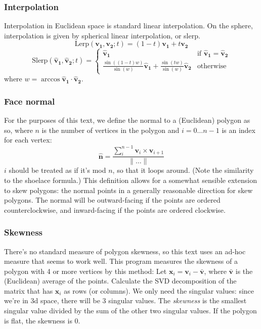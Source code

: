 \documentclass{amsart}[12pt]
\begin{document}
\subsubsection{Interpolation}
Interpolation in Euclidean space is standard linear interpolation. On the
sphere, interpolation is given by spherical linear interpolation, or slerp.
\begin{equation}
\mathrm{Lerp}(\mathbf{v_1}, \mathbf{v_2}; t) =
       (1-t) \mathbf{v_1} + t \mathbf{v_2}
\end{equation}
\begin{equation}
\mathrm{Slerp}(\mathbf{\hat{v}_1}, \mathbf{\hat{v}_2}; t) =
\begin{cases}\mathbf{\hat{v}_1}
  & \text{if } \mathbf{\hat{v}_1} = \mathbf{\hat{v}_2}\\
        \frac{\sin ((1-t)w)}{\sin (w)} \mathbf{\hat{v}_1} +
       \frac{\sin (tw)}{\sin (w)} \mathbf{\hat{v}_2}
  &\text{otherwise}
      \end{cases}
\end{equation}
where $w = \arccos \mathbf{\hat{v}_1} \cdot \mathbf{\hat{v}_2}$.

\subsubsection{Face normal}
For the purposes of this text, we define the normal to a (Euclidean) polygon as
so, where $n$ is the number of vertices in the polygon and
$i = 0 \dots n-1$ is an index for each vertex:
\begin{equation}
  \hat{\mathbf{n}} =
  \frac{\sum^{n-1}_i \mathbf{v}_i \times \mathbf{v}_{i+1}}{\|\dots\|}
\end{equation}
$i$ should be treated as if it's mod $n$, so that it loops around.
(Note the similarity to the shoelace formula.)
This definition allows for a somewhat sensible extension to skew polygons:
the normal points in a generally reasonable direction for skew polygons.
The normal will be outward-facing if the points are ordered counterclockwise,
and inward-facing if the points are ordered clockwise.

\subsubsection{Skewness}
There's no standard measure of polygon skewness, so this text uses an ad-hoc
measure that seems to work well. This program measures the skewness of a polygon
with 4 or more vertices by this method: Let $\mathbf x_i = \mathbf{v}_i -
\bar{\mathbf{v}}$, where $\bar{\mathbf{v}}$ is the (Euclidean) average of the
points. Calculate the SVD decomposition of the matrix that has $\mathbf x_i$
as rows (or columns). We only need the singular values: since we're in 3d
space, there will be 3 singular values. The \textit{skewness} is the smallest
singular value divided by the sum of the  other two singular values.
If the polygon is flat, the skewness is 0.
\end{document}
